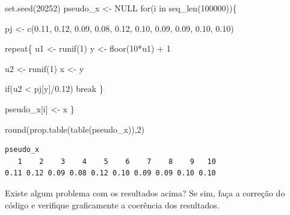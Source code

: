 \documentclass[
  letterpaper,
  DIV=11,
  numbers=noendperiod]{scrreprt}
\newenvironment{Shaded}{\begin{snugshade}}{\end{snugshade}}
\newcommand{\ConstantTok}[1]{\textcolor[rgb]{0.56,0.35,0.01}{#1}}
\newcommand{\ControlFlowTok}[1]{\textcolor[rgb]{0.00,0.23,0.31}{#1}}
\newcommand{\DecValTok}[1]{\textcolor[rgb]{0.68,0.00,0.00}{#1}}
\newcommand{\FloatTok}[1]{\textcolor[rgb]{0.68,0.00,0.00}{#1}}
\newcommand{\FunctionTok}[1]{\textcolor[rgb]{0.28,0.35,0.67}{#1}}
\newcommand{\NormalTok}[1]{\textcolor[rgb]{0.00,0.23,0.31}{#1}}
\newcommand{\OtherTok}[1]{\textcolor[rgb]{0.00,0.23,0.31}{#1}}
\newcommand{\SpecialCharTok}[1]{\textcolor[rgb]{0.37,0.37,0.37}{#1}}
\begin{document}
\begin{Shaded}
\begin{Highlighting}[]
\FunctionTok{set.seed}\NormalTok{(}\DecValTok{20252}\NormalTok{)}
\NormalTok{pseudo\_x }\OtherTok{\textless{}{-}} \ConstantTok{NULL}
\ControlFlowTok{for}\NormalTok{(i }\ControlFlowTok{in} \FunctionTok{seq\_len}\NormalTok{(}\DecValTok{100000}\NormalTok{))\{}
  
\NormalTok{pj }\OtherTok{\textless{}{-}} \FunctionTok{c}\NormalTok{(}\FloatTok{0.11}\NormalTok{, }\FloatTok{0.12}\NormalTok{, }\FloatTok{0.09}\NormalTok{, }\FloatTok{0.08}\NormalTok{, }\FloatTok{0.12}\NormalTok{, }\FloatTok{0.10}\NormalTok{, }\FloatTok{0.09}\NormalTok{, }\FloatTok{0.09}\NormalTok{, }\FloatTok{0.10}\NormalTok{, }\FloatTok{0.10}\NormalTok{)}


\ControlFlowTok{repeat}\NormalTok{\{}
\NormalTok{u1 }\OtherTok{\textless{}{-}} \FunctionTok{runif}\NormalTok{(}\DecValTok{1}\NormalTok{)}
\NormalTok{y }\OtherTok{\textless{}{-}} \FunctionTok{floor}\NormalTok{(}\DecValTok{10}\SpecialCharTok{*}\NormalTok{u1) }\SpecialCharTok{+} \DecValTok{1}
  
\NormalTok{u2 }\OtherTok{\textless{}{-}} \FunctionTok{runif}\NormalTok{(}\DecValTok{1}\NormalTok{)}
\NormalTok{x }\OtherTok{\textless{}{-}}\NormalTok{ y}

\ControlFlowTok{if}\NormalTok{(u2 }\SpecialCharTok{\textless{}}\NormalTok{ pj[y]}\SpecialCharTok{/}\FloatTok{0.12}\NormalTok{) }\ControlFlowTok{break}
\NormalTok{\}}

\NormalTok{pseudo\_x[i] }\OtherTok{\textless{}{-}}\NormalTok{ x}
\NormalTok{\}}

\FunctionTok{round}\NormalTok{(}\FunctionTok{prop.table}\NormalTok{(}\FunctionTok{table}\NormalTok{(pseudo\_x)),}\DecValTok{2}\NormalTok{)}
\end{Highlighting}
\end{Shaded}

\begin{verbatim}
pseudo_x
   1    2    3    4    5    6    7    8    9   10 
0.11 0.12 0.09 0.08 0.12 0.10 0.09 0.09 0.10 0.10 
\end{verbatim}

Existe algum problema com os resultados acima? Se sim, faça a correção
do código e verifique graficamente a coerência dos resultados.
\end{document}
